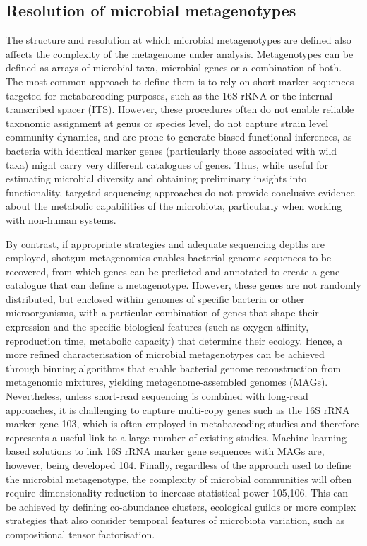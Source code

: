 \documentclass[
]{book}
\begin{document}
\hypertarget{microbial-metagenotype-resolution}{%
\subsection*{Resolution of microbial metagenotypes}\label{microbial-metagenotype-resolution}}

The structure and resolution at which microbial metagenotypes are defined also affects the complexity of the metagenome under analysis. Metagenotypes can be defined as arrays of microbial taxa, microbial genes or a combination of both. The most common approach to define them is to rely on short marker sequences targeted for metabarcoding purposes, such as the 16S rRNA or the internal transcribed spacer (ITS). However, these procedures often do not enable reliable taxonomic assignment at genus or species level, do not capture strain level community dynamics, and are prone to generate biased functional inferences, as bacteria with identical marker genes (particularly those associated with wild taxa) might carry very different catalogues of genes. Thus, while useful for estimating microbial diversity and obtaining preliminary insights into functionality, targeted sequencing approaches do not provide conclusive evidence about the metabolic capabilities of the microbiota, particularly when working with non-human systems.

By contrast, if appropriate strategies and adequate sequencing depths are employed, shotgun metagenomics enables bacterial genome sequences to be recovered, from which genes can be predicted and annotated to create a gene catalogue that can define a metagenotype. However, these genes are not randomly distributed, but enclosed within genomes of specific bacteria or other microorganisms, with a particular combination of genes that shape their expression and the specific biological features (such as oxygen affinity, reproduction time, metabolic capacity) that determine their ecology. Hence, a more refined characterisation of microbial metagenotypes can be achieved through binning algorithms that enable bacterial genome reconstruction from metagenomic mixtures, yielding metagenome-assembled genomes (MAGs). Nevertheless, unless short-read sequencing is combined with long-read approaches, it is challenging to capture multi-copy genes such as the 16S rRNA marker gene 103, which is often employed in metabarcoding studies and therefore represents a useful link to a large number of existing studies. Machine learning-based solutions to link 16S rRNA marker gene sequences with MAGs are, however, being developed 104. Finally, regardless of the approach used to define the microbial metagenotype, the complexity of microbial communities will often require dimensionality reduction to increase statistical power 105,106. This can be achieved by defining co-abundance clusters, ecological guilds or more complex strategies that also consider temporal features of microbiota variation, such as compositional tensor factorisation.
\end{document}
